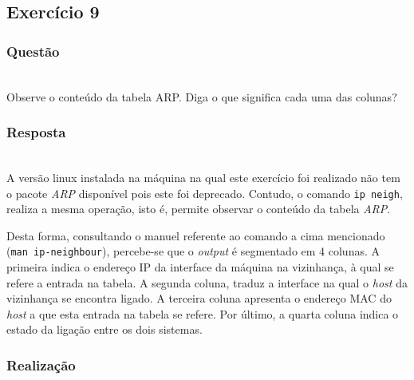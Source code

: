 \documentclass{llncs}
\begin{document}
\clearpage
\subsection{Exercício 9}
\subsubsection{Questão}\rule[-10pt]{0pt}{10pt}\\

Observe o conteúdo da tabela ARP. Diga o que significa cada uma das colunas?

\subsubsection{Resposta}\rule[-10pt]{0pt}{10pt}\\

A versão linux instalada na máquina na qual este exercício foi realizado não tem o pacote \textit{ARP} disponível pois este foi deprecado. Contudo, o comando \texttt{ip neigh}, realiza a mesma operação, isto é, permite observar o conteúdo da tabela \textit{ARP}.

Desta forma, consultando o manuel referente ao comando a cima mencionado (\texttt{man ip-neighbour}), percebe-se que o \textit{output} é segmentado em 4 colunas. A primeira indica o endereço IP da interface da máquina na vizinhança, à qual se refere a entrada na tabela. A segunda coluna, traduz a interface na qual o \textit{host} da vizinhança se encontra ligado. A terceira coluna apresenta o endereço MAC do \textit{host} a que esta entrada na tabela se refere. Por último, a quarta coluna indica o estado da ligação entre os dois sistemas.

\subsubsection{Realização}\rule[-10pt]{0pt}{10pt}\\
\end{document}
